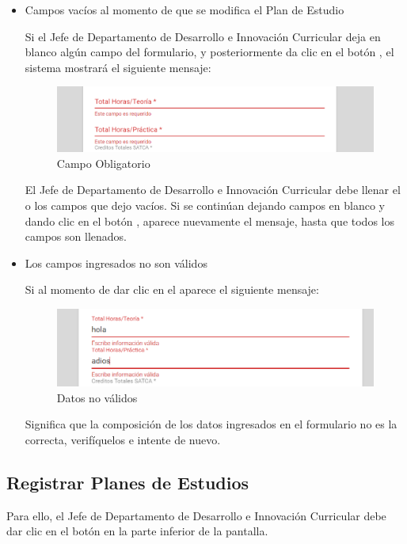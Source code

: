 \begin{itemize}
	\item Campos vacíos al momento de que se modifica el Plan de Estudio

	Si el Jefe de Departamento de Desarrollo e Innovación Curricular deja en blanco algún campo del formulario, y posteriormente da clic en el botón  , el sistema mostrará el siguiente mensaje:

		\begin{figure}[!hbtp]
		\centering
		\hypertarget{ms4}{\includegraphics[width=0.7\linewidth]{images/SP4-GPE/m4}}
		\caption{Campo Obligatorio}
		\label{ms4}
	\end{figure}

	 El Jefe de Departamento de Desarrollo e Innovación Curricular debe llenar el o los campos que dejo vacíos. Si se continúan dejando campos en blanco y dando clic en el botón  , aparece nuevamente el mensaje, hasta que todos los campos son llenados.


	\item Los campos ingresados no son válidos

	Si al momento de dar clic en el  aparece el siguiente mensaje:
	\begin{figure}[!hbtp]
		\centering
		\hypertarget{ms5}{\includegraphics[width=0.7\linewidth]{images/SP4-GPE/m5}}
		\caption{Datos no válidos}
		\label{ms5}
	\end{figure}

	Significa que la composición de los datos ingresados en el formulario no es la correcta, verifíquelos e intente de nuevo.

\end{itemize}


\newpage
\subsection{Registrar Planes de Estudios}

Para ello, el Jefe de Departamento de Desarrollo e Innovación Curricular debe dar clic en el botón \IUbutton{+} en la parte inferior de la pantalla.

